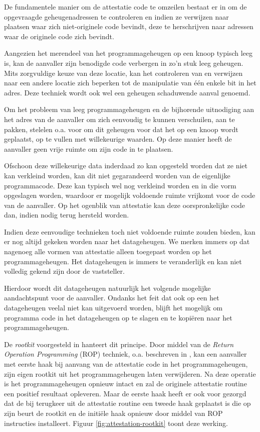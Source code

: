 De fundamentele manier om de attestatie code te omzeilen bestaat er in om de
opgevraagde geheugenadressen te controleren en indien ze verwijzen naar
plaatsen waar zich niet-originele code bevindt, deze te herschrijven naar
adressen waar de originele code zich bevindt.

Aangezien het merendeel van het programmageheugen op een knoop typisch leeg
is, kan de aanvaller zijn benodigde code verbergen in zo'n stuk leeg geheugen.
Mits zorgvuldige keuze van deze locatie, kan het controleren van en verwijzen
naar een andere locatie zich beperken tot de manipulatie van \'e\'en enkele bit
in het adres. Deze techniek wordt ook wel een geheugen schaduwende aanval
genoemd.

Om het probleem van leeg programmageheugen en de bijhorende uitnodiging aan
het adres van de aanvaller om zich eenvoudig te kunnen verschuilen, aan te
pakken, stelelen o.a. \citep{yang2007distributed,seshadri2008sake} voor om dit
geheugen voor dat het op een knoop wordt geplaatst, op te vullen met
willekeurige waarden. Op deze manier heeft de aanvaller geen vrije ruimte om
zijn code in te plaatsen.

Ofschoon deze willekeurige data inderdaad zo kan opgesteld worden dat ze niet
kan verkleind worden, kan dit niet gegarandeerd worden van de eigenlijke
programmacode. Deze kan typisch wel nog verkleind worden en in die vorm
opgeslagen worden, waardoor er mogelijk voldoende ruimte vrijkomt voor de code
van de aanvaller. Op het ogenblik van attestatie kan deze oorspronkelijke code
dan, indien nodig terug hersteld worden.

Indien deze eenvoudige technieken toch niet voldoende ruimte zouden bieden, kan
er nog altijd gekeken worden naar het datageheugen. We merken immers op dat
nagenoeg alle vormen van attestatie alleen toegepast worden op het programmageheugen. Het datageheugen is immers te veranderlijk en kan niet volledig
gekend zijn door de vaststeller.

Hierdoor wordt dit datageheugen natuurlijk het volgende mogelijke
aandachtspunt voor de aanvaller. Ondanks het feit dat ook op een \mcu het datageheugen veelal niet kan uitgevoerd worden, blijft het mogelijk om programma
code in het datageheugen op te slagen en te kopi\"eren naar het programmageheugen.

De \emph{rootkit} voorgesteld in \citep{castelluccia2009difficulty} hanteert dit
principe. Door middel van de \emph{Return Operation Programming} (ROP)
techniek, o.a. beschreven in \citep{prandini2012return}, kan een aanvaller met
eerste haak bij aanvang van de attestatie code in het programmageheugen, zijn
eigen rootkit uit het programmageheugen laten verwijderen. Na deze operatie is
het programmageheugen opnieuw intact en zal de originele attestatie routine
een positief resultaat opleveren. Maar de eerste haak heeft er ook voor gezorgd
dat de bij terugkeer uit de attestatie routine een tweede haak geplaatst is die
op zijn beurt de rootkit en de initi\"ele haak opnieuw door middel van ROP
instructies installeert. Figuur \ref{fig:attestation-rootkit} toont deze
werking.

